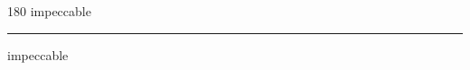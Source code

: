 
\begin{frame}
\begin{center}
\begin{turn}{180}
{\fontsize{2.5cm}{1em}\selectfont impeccable}
\end{turn}
\vspace{1em}\par  
\hrule
\vspace{1em}\par  
{\fontsize{2.5cm}{1em}\selectfont impeccable}
\end{center}
\end{frame}
